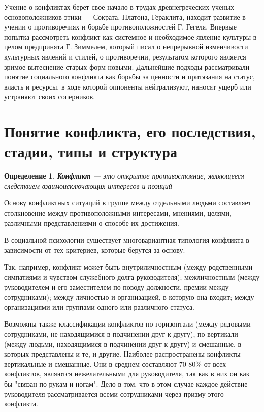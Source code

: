\documentclass[a4paper,14pt]{extarticle}
\newtheorem{definition}{Определение}
\begin{document}
\hfill

Учение о конфликтах берет свое начало в трудах древнегреческих ученых — основоположников этики — Сократа, Платона, Гераклита, находит развитие в учении о противоречиях и борьбе противоположностей Г. Гегеля. Впервые попытка рассмотреть конфликт как системное и необходимое явление культуры в целом предпринята Г. Зиммелем, который писал о непрерывной изменчивости культурных явлений и стилей, о противоречии, результатом которого является зримое вытеснение старых форм новыми. Дальнейшие подходы рассматривали понятие социального конфликта как борьбы за ценности и притязания на статус, власть и ресурсы, в ходе которой оппоненты нейтрализуют,
наносят ущерб или устраняют своих соперников.

\pagebreak
\section{Понятие конфликта, его последствия, стадии, типы и структура}

\begin{definition}
\textbf{Конфликт} — это открытое противостояние, являющееся следствием взаимоисключающих интересов и позиций
\end{definition}

Основу конфликтных ситуаций в группе между отдельными людьми составляет столкновение между противоположными интересами, мнениями, целями, различными представлениями о способе их достижения.

В социальной психологии существует многовариантная типология конфликта в зависимости от тех критериев, которые берутся за основу.

\hfill

Так, например, конфликт может быть внутриличностным (между родственными симпатиями и чувством служебного долга руководителя); межличностным (между руководителем и его заместителем по поводу должности, премии между сотрудниками); между личностью и организацией, в которую она входит; между организациями или группами одного или различного статуса.

\hfill

Возможны также классификации конфликтов по горизонтали (между рядовыми сотрудниками, не находящимися в подчинении друг к другу), по вертикали (между людьми, находящимися в подчинении друг к другу) и смешанные, в которых представлены и те, и другие. Наиболее распространены конфликты вертикальные и смешанные. Они в среднем составляют 70-80\% от всех конфликтов, являются нежелательными для руководителя, так как в них он как бы "связан по рукам и ногам". Дело в том, что в этом случае каждое действие руководителя рассматривается всеми сотрудниками через призму этого конфликта.
\end{document}
